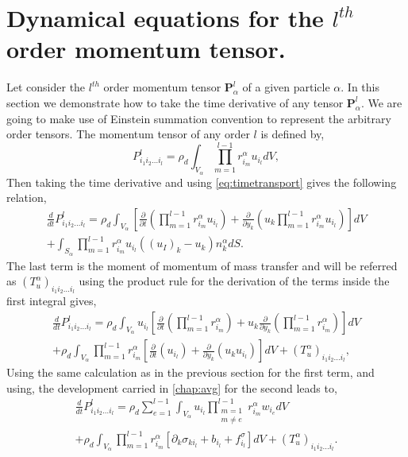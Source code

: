 \section{Dynamical equations for the $l^{th}$ order momentum tensor.}
Let consider the $l^{th}$ order momentum tensor $\bm{P}^l_\alpha$ of a given particle $\alpha$. 
In this section we demonstrate how to take the time derivative of any tensor $\bm{P}^l_\alpha$. 
We are going to make use of Einstein summation convention to represent the arbitrary order tensors. 
The momentum tensor of any order $l$ is defined by,
\begin{equation}
    P_{i_1i_2\ldots i_l}^{l} = \rho_d \int_{V_\alpha} \prod^{l-1}_{m=1}r^\alpha_{i_m} u_{i_l} dV,
\end{equation}
Then taking the time derivative and using \ref{eq:timetransport} gives the following relation,
\begin{multline*}
    \frac{d}{dt}P_{i_1i_2\ldots i_l}^l 
    = \rho_d \int_{V_\alpha} \left[ \frac{\partial}{\partial t} \left(\prod^{l-1}_{m=1}r^\alpha_{i_m} u_{i_l}\right) 
    + \frac{\partial}{\partial y_k} \left(u_k\prod^{l-1}_{m=1}r^\alpha_{i_m} u_{i_l}\right) \right]dV\\
    +\int_{S_\alpha} \prod^{l-1}_{m=1}r^\alpha_{i_m} u_{i_l} \left((u_I)_k - u_k\right) n_k^\alpha dS.
\end{multline*}
The last term is the moment of momentum of mass transfer and will be referred as $(T_u^\alpha)_{i_1i_2\ldots i_l}$ 
using the product rule for the derivation of the terms inside the first integral gives, 
\begin{multline*}
    \frac{d}{dt}P_{i_1i_2\ldots i_l}^l 
    = 
    \rho_d \int_{V_\alpha} u_{i_l}\left[  \frac{\partial}{\partial t} \left(\prod^{l-1}_{m=1}r^\alpha_{i_m} \right) 
    + u_k \frac{\partial}{\partial y_k} \left(\prod^{l-1}_{m=1}r^\alpha_{i_m}\right) \right]dV\\
    +\rho_d \int_{V_\alpha}  \prod^{l-1}_{m=1}r^\alpha_{i_m} \left[ 
    \frac{\partial}{\partial t} \left(u_{i_l}\right) 
    + \frac{\partial}{\partial y_k} \left(u_k u_{i_l}\right) 
    \right]dV
    +(T_u^\alpha)_{i_1i_2\ldots i_l},
\end{multline*}
Using the same calculation as in the previous section for the first term, and using,  the development carried in \ref{chap:avg} for the second leads to, 
\begin{multline*}
    \frac{d}{dt}P_{i_1i_2\ldots i_l}^l 
    = 
    \rho_d \sum_{e=1}^{l-1} \int_{V_\alpha} u_{i_l}  \prod^{l-1}_{\substack{ m=1 \\   m \neq e}} r^\alpha_{i_m} w_{i_e}dV\\
    +\rho_d \int_{V_\alpha}  \prod^{l-1}_{m=1}r^\alpha_{i_m} \left[ 
    \partial_k \sigma_{ki_l} + b_{i_l} + f^\sigma_{i_l}   
    \right]dV
    +(T_u^\alpha)_{i_1i_2\ldots i_l}.
    \label{eq:B68}
\end{multline*}
